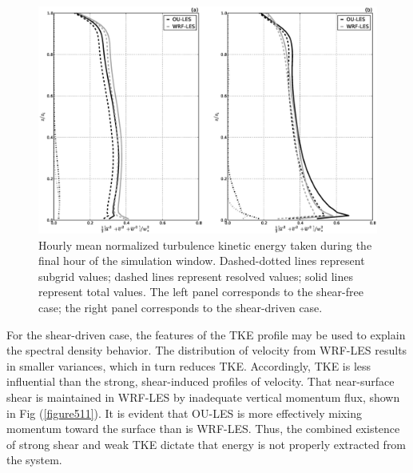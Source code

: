 \begin{figure}[!ht]
\begin{center}
\includegraphics[width=\textwidth]{figures/chapter5/tke}
\end{center}
\caption{Hourly mean normalized turbulence kinetic energy taken during the final hour of the simulation window. Dashed-dotted lines represent subgrid values; dashed lines represent resolved values; solid lines represent total values. The left panel corresponds to the shear-free case; the right panel corresponds to the shear-driven case.}
\label{figure510}
\end{figure}


For the shear-driven case, the features of the TKE profile may be used to explain the spectral density behavior. The distribution of velocity from WRF-LES results in smaller variances, which in turn reduces TKE. Accordingly, TKE is less influential than the strong, shear-induced profiles of velocity. That near-surface shear is maintained in WRF-LES by inadequate vertical momentum flux, shown in Fig (\autoref{figure511}). It is evident that OU-LES is more effectively mixing momentum toward the surface than is WRF-LES. Thus, the combined existence of strong shear and weak TKE dictate that energy is not properly extracted from the system.


